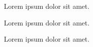 \documentclass{article}
\begin{document}
Lorem ipsum dolor sit amet.


Lorem ipsum dolor sit amet.


Lorem ipsum dolor sit amet.
\end{document}
